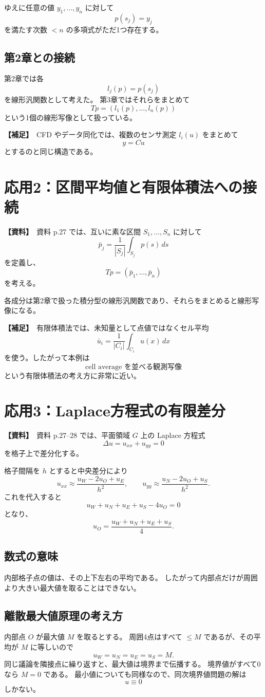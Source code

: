 \documentclass[a4paper,11pt]{ltjsarticle}
\newcommand{\sourceitem}{\textbf{【資料】}}
\newcommand{\suppitem}{\textbf{【補足】}}
\begin{document}
ゆえに任意の値 $y_1,\dots,y_n$ に対して
\[
p(s_j)=y_j
\]
を満たす次数 $<n$ の多項式がただ1つ存在する。

\subsection{第2章との接続}
第2章では各
\[
l_j(p)=p(s_j)
\]
を線形汎関数として考えた。
第3章ではそれらをまとめて
\[
Tp=(l_1(p),\dots,l_n(p))
\]
という1個の線形写像として扱っている。

\suppitem\ CFD やデータ同化では、複数のセンサ測定 $l_i(u)$ をまとめて
\[
y=Cu
\]
とするのと同じ構造である。

\section{応用2：区間平均値と有限体積法への接続}

\sourceitem\ 資料 p.27 では、互いに素な区間 $S_1,\dots,S_n$ に対して
\[
\bar p_j=\frac{1}{|S_j|}\int_{S_j}p(s)\,ds
\]
を定義し、
\[
Tp=(\bar p_1,\dots,\bar p_n)
\]
を考える。

各成分は第2章で扱った積分型の線形汎関数であり、それらをまとめると線形写像になる。

\suppitem\ 有限体積法では、未知量として点値ではなくセル平均
\[
\bar u_i=\frac{1}{|C_i|}\int_{C_i}u(x)\,dx
\]
を使う。したがって本例は
\[
\boxed{\text{cell average を並べる観測写像}}
\]
という有限体積法の考え方に非常に近い。

\section{応用3：Laplace方程式の有限差分}

\sourceitem\ 資料 p.27--28 では、平面領域 $G$ 上の Laplace 方程式
\[
\Delta u=u_{xx}+u_{yy}=0
\]
を格子上で差分化する。

格子間隔を $h$ とすると中央差分により
\[
u_{xx}\approx\frac{u_W-2u_O+u_E}{h^2},
\qquad
u_{yy}\approx\frac{u_N-2u_O+u_S}{h^2}.
\]
これを代入すると
\[
u_W+u_N+u_E+u_S-4u_O=0
\]
となり、
\[
\boxed{
u_O=\frac{u_W+u_N+u_E+u_S}{4}.}
\]

\subsection{数式の意味}
内部格子点の値は、その上下左右の平均である。
したがって内部点だけが周囲より大きい最大値を取ることはできない。

\subsection{離散最大値原理の考え方}
内部点 $O$ が最大値 $M$ を取るとする。
周囲4点はすべて $\le M$ であるが、その平均が $M$ に等しいので
\[
u_W=u_N=u_E=u_S=M.
\]
同じ議論を隣接点に繰り返すと、最大値は境界まで伝播する。
境界値がすべて0なら $M=0$ である。
最小値についても同様なので、同次境界値問題の解は
\[
u\equiv0
\]
しかない。
\end{document}
